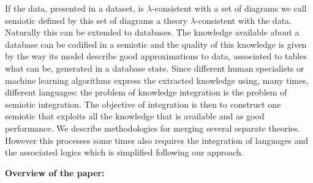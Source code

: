 \documentclass[oribibl]{llncs}
\begin{document}
If the data, presented in a dataset, is $\lambda$-consistent with a set of diagrams we call  semiotic defined by this set of diagrams a theory $\lambda$-consistent with the data. Naturally this can be extended to databases. The knowledge available about a database can be codified in a semiotic and the quality of this knowledge is given by the way its model describe good approximations to data, associated to tables what can be, generated in a database state. Since different human specialists or machine learning algorithms express the extracted knowledge using, many times, different languages: the problem of knowledge integration is the problem of semiotic integration. The objective of integration is then to construct one semiotic that exploits all the knowledge that is available and as good performance. We describe methodologies for merging several separate theories. However this processes some times also requires the integration of languages and the associated logics which is simplified following our approach.



\textbf{Overview of the paper:}
\end{document}
